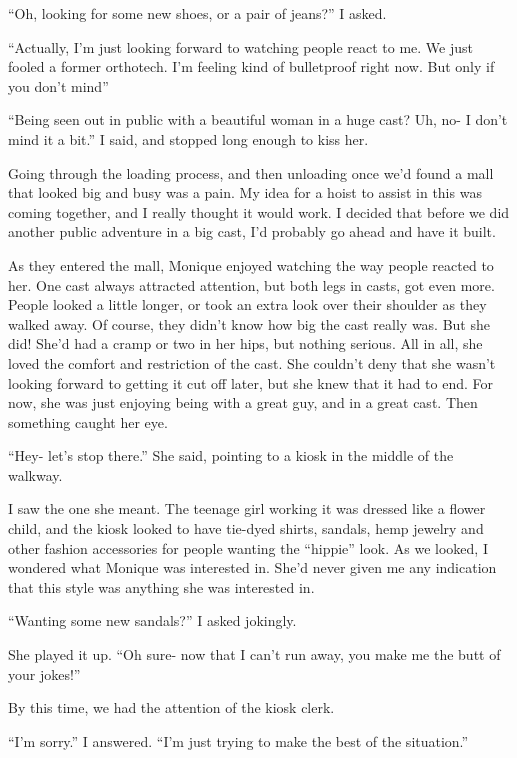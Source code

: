 ``Oh, looking for some new shoes, or a pair of jeans?'' I asked.

``Actually, I'm just looking forward to watching people react to me. We just fooled a former
orthotech. I'm feeling kind of bulletproof right now. But only if you don't mind''

``Being seen out in public with a beautiful woman in a huge cast? Uh, no- I don't mind it a
bit.'' I said, and stopped long enough to kiss her.

Going through the loading process, and then unloading once we'd found a mall that looked
big and busy was a pain. My idea for a hoist to assist in this was coming together, and I really
thought it would work. I decided that before we did another public adventure in a big cast, I'd
probably go ahead and have it built.

\begin{thought}
As they entered the mall, Monique enjoyed watching the way people reacted to her. One cast
always attracted attention, but both legs in casts, got even more. People looked a little
longer, or took an extra look over their shoulder as they walked away. Of course, they didn't
know how big the cast really was. But she did! She'd had a cramp or two in her hips, but nothing
serious. All in all, she loved the comfort and restriction of the cast. She couldn't deny that
she wasn't looking forward to getting it cut off later, but she knew that it had to end. For
now, she was just enjoying being with a great guy, and in a great cast. Then something caught
her eye.
\end{thought}

``Hey- let's stop there.'' She said, pointing to a kiosk in the middle of the walkway.

I saw the one she meant. The teenage girl working it was dressed like a flower child, and
the kiosk looked to have tie-dyed shirts, sandals, hemp jewelry and other fashion accessories
for people wanting the ``hippie'' look. As we looked, I wondered what Monique was interested in.
She'd never given me any indication that this style was anything she was interested in.

``Wanting some new sandals?'' I asked jokingly.

She played it up. ``Oh sure- now that I can't run away, you make me the butt of your jokes!''

By this time, we had the attention of the kiosk clerk.

``I'm sorry.'' I answered. ``I'm just trying to make the best of the situation.''

